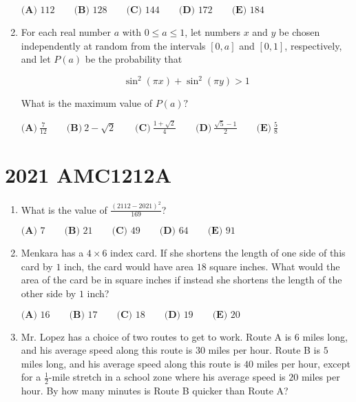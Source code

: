 \documentclass{article}
\begin{document}
\begin{enumerate}[label=\arabic*., itemsep=0.5em]
\(\textbf{(A) } 112 \qquad\textbf{(B) } 128 \qquad\textbf{(C) } 144 \qquad\textbf{(D) } 172 \qquad\textbf{(E) } 184\)\par \vspace{0.5em}\item For each real number \(a\) with \(0 \leq a \leq 1\), let numbers \(x\) and \(y\) be chosen independently at random from the intervals \([0, a]\) and \([0, 1]\), respectively, and let \(P(a)\) be the probability that


\begin{equation*}
\sin^2{(\pi x)} + \sin^2{(\pi y)} > 1
\end{equation*}

What is the maximum value of \(P(a)?\)

\(\textbf{(A)}\ \frac{7}{12} \qquad\textbf{(B)}\ 2 - \sqrt{2} \qquad\textbf{(C)}\ \frac{1+\sqrt{2}}{4} \qquad\textbf{(D)}\ \frac{\sqrt{5}-1}{2} \qquad\textbf{(E)}\ \frac{5}{8}\)\par \vspace{0.5em}\end{enumerate}\newpage\section*{2021 AMC1212A}\begin{enumerate}[label=\arabic*., itemsep=0.5em]\item What is the value of \(\frac{(2112-2021)^2}{169}\)?

\(\textbf{(A) } 7 \qquad\textbf{(B) } 21 \qquad\textbf{(C) } 49 \qquad\textbf{(D) } 64 \qquad\textbf{(E) } 91\)\par \vspace{0.5em}\item Menkara has a \(4 \times 6\) index card. If she shortens the length of one side of this card by \(1\) inch, the card would have area \(18\) square inches. What would the area of the card be in square inches if instead she shortens the length of the other side by \(1\) inch?

\(\textbf{(A) }16\qquad\textbf{(B) }17\qquad\textbf{(C) }18\qquad\textbf{(D) }19\qquad\textbf{(E) }20\)\par \vspace{0.5em}\item Mr. Lopez has a choice of two routes to get to work. Route A is \(6\) miles long, and his average speed along this route is \(30\) miles per hour. Route B is \(5\) miles long, and his average speed along this route is \(40\) miles per hour, except for a \(\frac{1}{2}\)-mile stretch in a school zone where his average speed is \(20\) miles per hour. By how many minutes is Route B quicker than Route A?


\end{enumerate}
\end{document}

